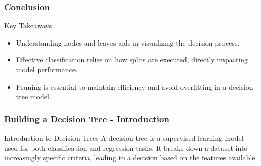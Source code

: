 \documentclass[aspectratio=169]{beamer}
\begin{document}
\begin{frame}
    \frametitle{Conclusion}
    \begin{block}{Key Takeaways}
        \begin{itemize}
            \item Understanding nodes and leaves aids in visualizing the decision process.
            \item Effective classification relies on how splits are executed, directly impacting model performance.
            \item Pruning is essential to maintain efficiency and avoid overfitting in a decision tree model.
        \end{itemize}
    \end{block}
\end{frame}

\begin{frame}[fragile]
    \frametitle{Building a Decision Tree - Introduction}
    \begin{block}{Introduction to Decision Trees}
        A decision tree is a supervised learning model used for both classification and regression tasks. It breaks down a dataset into increasingly specific criteria, leading to a decision based on the features available.
    \end{block}
\end{frame}
\end{document}
